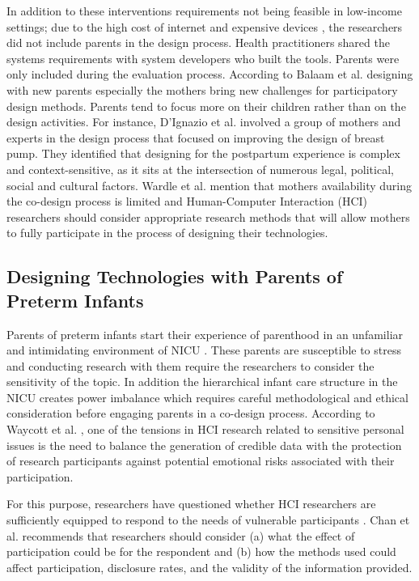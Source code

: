 In addition to these interventions requirements not being feasible in low-income settings; due to the high cost of internet and expensive devices \textcite{Mars,Wamala2013}, the researchers did not include parents in the design process. Health practitioners shared the systems requirements with system developers who built the tools. Parents were only included during the evaluation process. According to Balaam et al. \textcite{Balaam2013} designing with new parents especially the mothers bring new challenges for participatory design methods. Parents tend to focus more on their children rather than on the design activities. For instance, D'Ignazio et al. \textcite{Ignazio2016} involved a group of mothers and experts in the design process that focused on improving the design of breast pump. They identified that designing for the postpartum experience is complex and context-sensitive, as it sits at the intersection of numerous legal, political, social and cultural factors. Wardle et al. \textcite{Wardle2018a} mention that mothers availability during the co-design process is limited and Human-Computer Interaction (HCI) researchers should consider appropriate research methods that will allow mothers to fully participate in the process of designing their technologies.
\subsection{Designing Technologies with Parents of Preterm Infants}
Parents of preterm infants start their experience of parenthood in an unfamiliar and intimidating environment of NICU \textcite{Obeidat2009}. These parents are susceptible to stress and conducting research with them require the researchers to consider the sensitivity of the topic. In addition the hierarchical infant care structure in the NICU creates power imbalance which requires careful methodological and ethical consideration before engaging parents in a co-design process. According to Waycott et al. \textcite{Waycott2015}, one of the tensions in HCI research related to sensitive personal issues is the need to balance the generation of credible data with the protection of research participants against potential emotional risks associated with their participation.

For this purpose, researchers have questioned whether HCI researchers are sufficiently equipped to respond to the needs of vulnerable participants \textcite{Vines2013}. Chan et al. \textcite{Chan2017} recommends that researchers should consider (a) what the effect of participation could be for the respondent and (b) how the methods used could affect participation, disclosure rates, and the validity of the information provided. 

